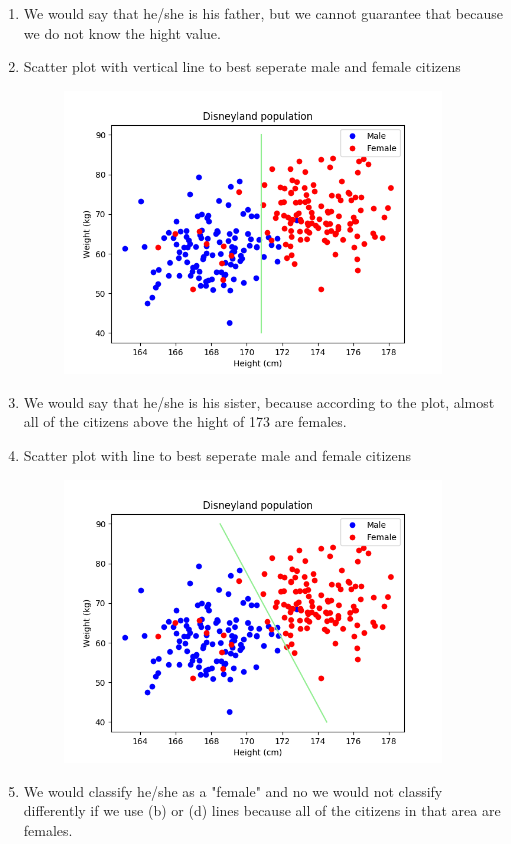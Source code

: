 \documentclass[12pt, a4paper]{article}
\begin{document}
\begin{enumerate}
\begin{enumerate}
		\item We would say that he/she is his father, but we cannot guarantee that because we do not know the hight value.
		\item Scatter plot with vertical line to best seperate male and female citizens
		\begin{figure}[h]
            \centering
            \includegraphics[width=10cm]{scatter_plot_line2}
        \end{figure}
        \item We would say that he/she is his sister, because according to the plot, almost all of the citizens 
        above the hight of 173 are females.
        \item Scatter plot with line to best seperate male and female citizens
		\begin{figure}[h]
            \centering
            \includegraphics[width=10cm]{scatter_plot_line3}
        \end{figure}
        \item We would classify he/she as a "female" and no we would not classify 
        differently if we use (b) or (d) lines because all of the citizens in that area 
        are females.
	\end{enumerate}
\end{enumerate}
\end{document}
